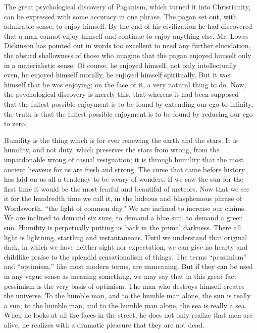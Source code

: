 The great psychological discovery of Paganism, which turned it into Christianity, can be expressed with some accuracy in one phrase. The pagan set out, with admirable sense, to enjoy himself. By the end of his civilization he had discovered that a man cannot enjoy himself and continue to enjoy anything else. Mr. Lowes Dickinson has pointed out in words too excellent to need any further elucidation, the absurd shallowness of those who imagine that the pagan enjoyed himself only in a materialistic sense. Of course, he enjoyed himself, not only intellectually even, he enjoyed himself morally, he enjoyed himself spiritually. But it was himself that he was enjoying; on the face of it, a very natural thing to do. Now, the psychological discovery is merely this, that whereas it had been supposed that the fullest possible enjoyment is to be found by extending our ego to infinity, the truth is that the fullest possible enjoyment is to be found by reducing our ego to zero.

Humility is the thing which is for ever renewing the earth and the stars. It is humility, and not duty, which preserves the stars from wrong, from the unpardonable wrong of casual resignation; it is through humility that the most ancient heavens for us are fresh and strong. The curse that came before history has laid on us all a tendency to be weary of wonders. If we saw the sun for the first time it would be the most fearful and beautiful of meteors. Now that we see it for the hundredth time we call it, in the hideous and blasphemous phrase of Wordsworth, “the light of common day.” We are inclined to increase our claims. We are inclined to demand six suns, to demand a blue sun, to demand a green sun. Humility is perpetually putting us back in the primal darkness. There all light is lightning, startling and instantaneous. Until we understand that original dark, in which we have neither sight nor expectation, we can give no hearty and childlike praise to the splendid sensationalism of things. The terms “pessimism” and “optimism,” like most modern terms, are unmeaning. But if they can be used in any vague sense as meaning something, we may say that in this great fact pessimism is the very basis of optimism. The man who destroys himself creates the universe. To the humble man, and to the humble man alone, the sun is really a sun; to the humble man, and to the humble man alone, the sea is really a sea. When he looks at all the faces in the street, he does not only realize that men are alive, he realizes with a dramatic pleasure that they are not dead.

